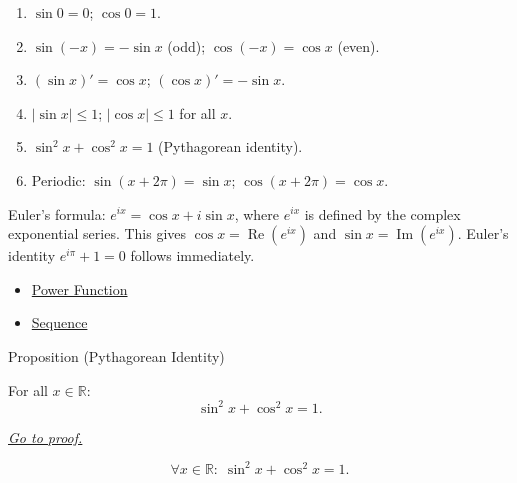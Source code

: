 \begin{remark*}[Interpretation]
\begin{enumerate}[label=(\roman*)]
  \item $\sin 0 = 0$;\; $\cos 0 = 1$.
  \item $\sin(-x) = -\sin x$ (odd);\; $\cos(-x) = \cos x$ (even).
  \item $(\sin x)' = \cos x$;\; $(\cos x)' = -\sin x$.
  \item $|\sin x| \leq 1$;\; $|\cos x| \leq 1$ for all $x$.
  \item $\sin^2 x + \cos^2 x = 1$ (Pythagorean identity).
  \item Periodic: $\sin(x+2\pi) = \sin x$;\; $\cos(x+2\pi) = \cos x$.
\end{enumerate}


Euler's formula: $e^{ix} = \cos x + i\sin x$, where $e^{ix}$ is
defined by the complex exponential series. This gives $\cos x =
\operatorname{Re}(e^{ix})$ and $\sin x = \operatorname{Im}(e^{ix})$.
Euler's identity $e^{i\pi} + 1 = 0$ follows immediately.
\end{remark*}

\begin{dependencies}
\begin{itemize}
  \item \hyperref[def:power-function]{Power Function}
  \item \hyperref[def:sequence]{Sequence}
\end{itemize}
\end{dependencies}


\begin{propositionbox}{Proposition (Pythagorean Identity)}
\begin{proposition}
\label{prop:pythagorean-identity}
For all $x \in \mathbb{R}$:
\[
  \sin^2 x + \cos^2 x = 1.
\]

\smallskip\noindent


\hyperref[prf:pythagorean-identity]{\textit{Go to proof.}}
\end{proposition}
\end{propositionbox}

\begin{remark*}
\[
  \forall x \in \mathbb{R} :\; \sin^2 x + \cos^2 x = 1.
\]
\end{remark*}

